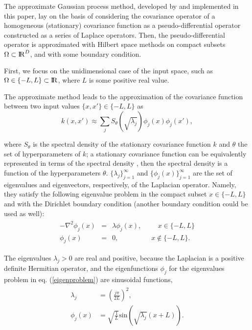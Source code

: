 \documentclass[]{interact}
\theoremstyle{plain}%
\theoremstyle{definition}
\theoremstyle{remark}
\begin{document}
The approximate Gaussian process method, developed by \cite{solin2018hilbert} and implemented in this paper, lay on the basis of considering the covariance operator of a homogeneous (stationary) covariance function as a pseudo-differential operator constructed as a series of Laplace operators. Then, the pseudo-differential operator is approximated with Hilbert space methods on compact subsets $\Omega \subset {\rm I\!R}^D$, and with some boundary condition. 

First, we focus on the unidimensional case of the input space, such as $\Omega \in \{-L,L\} \subset {\rm I\!R}$, where $L$ is some positive real value. 

\vspace{0.2cm}
The approximate method leads to the approximation of the covariance function between two input values $\{x,x'\} \in \{-L,L\}$ as 
%
\begin{equation}\label{approxcov}
k(x,x') \approx \sum_{j}S_{\theta}(\sqrt{\lambda_j}) \phi_j(x) \phi_j(x'),
\end{equation} 

\noindent where $S_{\theta}$ is the spectral density of the stationary covariance function $k$ and $\theta$ the set of hyperparameters of $k$; a stationary covariance function can be equivalently represented in terms of the spectral density \citep{rasmussen2006gaussian}, then the spectral density is a function of the hyperparameters $\theta$. $\{\lambda_j\}_{j=1}^{\infty}$ and $\{\phi_j(x)\}_{j=1}^{\infty}$ are the set of eigenvalues and eigenvectors, respectively, of the Laplacian operator. Namely, they satisfy the following eigenvalue problem in the compact subset $x \in \{-L,L\}$ and with the Dirichlet boundary condition (another boundary condition could be used as well):
%
\begin{eqnarray}\label{eigenproblem}
\begin{split}
-\nabla^2 \phi_j(x)&=&\lambda \phi_j(x), \hspace{1cm}  x\in \{-L,L\} \\ 
\phi_j(x)&=&0, \hspace{2cm} x\notin \{-L,L\}.
\end{split}
\end{eqnarray} 

\noindent The eigenvalues $\lambda_j>0$ are real and positive, because the Laplacian is a positive definite Hermitian operator, and the eigenfunctions $\phi_j$ for the eigenvalues problem in eq. (\ref{eigenproblem}) are sinusoidal functions,
%
\begin{eqnarray}\label{bf&lambda}
\begin{split}
\lambda_j&=\left(\frac{j\pi}{2L}\right)^2, \\
\phi_j(x)&=\sqrt{\frac{1}{L}} \text{sin}\left(\sqrt{\lambda_j}(x+L)\right).
\end{split}
\end{eqnarray}
\end{document}
